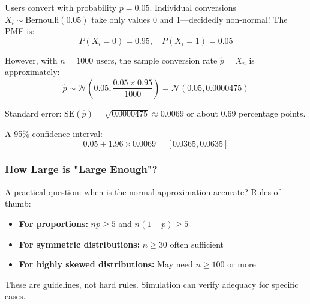 \begin{example}
Users convert with probability $p = 0.05$. Individual conversions $X_i \sim \text{Bernoulli}(0.05)$ take only values 0 and 1—decidedly non-normal! The PMF is:
\begin{equation}
P(X_i = 0) = 0.95, \quad P(X_i = 1) = 0.05
\end{equation}

However, with $n = 1000$ users, the sample conversion rate $\hat{p} = \bar{X}_n$ is approximately:
\begin{equation}
\hat{p} \sim \mathcal{N}\left(0.05, \frac{0.05 \times 0.95}{1000}\right) = \mathcal{N}(0.05, 0.0000475)
\end{equation}

Standard error: $\text{SE}(\hat{p}) = \sqrt{0.0000475} \approx 0.0069$ or about 0.69 percentage points.

A 95\% confidence interval:
\begin{equation}
0.05 \pm 1.96 \times 0.0069 = [0.0365, 0.0635]
\end{equation}
\end{example}

\subsubsection{How Large is "Large Enough"?}

A practical question: when is the normal approximation accurate? Rules of thumb:

\begin{itemize}
    \item \textbf{For proportions:} $np \geq 5$ and $n(1-p) \geq 5$
    \item \textbf{For symmetric distributions:} $n \geq 30$ often sufficient
    \item \textbf{For highly skewed distributions:} May need $n \geq 100$ or more
\end{itemize}

These are guidelines, not hard rules. Simulation can verify adequacy for specific cases.

